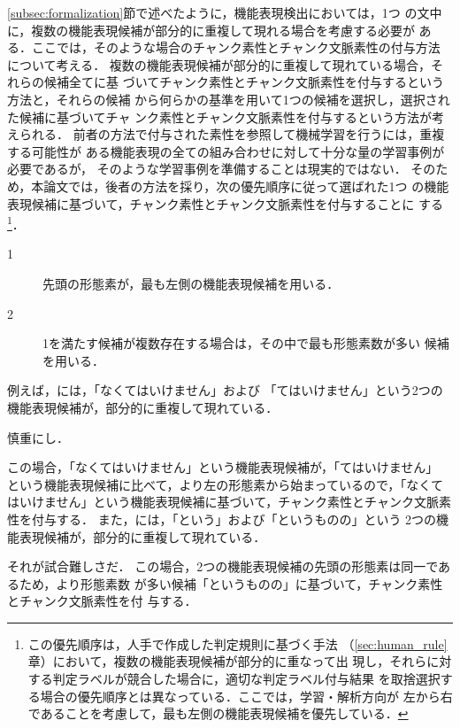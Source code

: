 \documentclass[japanese]{jnlp_1.2d}
\newcommand{\uline}[1]{}
\newcounter{example}
\newenvironment{example}{}{}
\newcommand{\strref}[1]{}
\begin{document}
\ref{subsec:formalization}節で述べたように，機能表現検出においては，1つ
の文中に，複数の機能表現候補が部分的に重複して現れる場合を考慮する必要が
ある．ここでは，そのような場合のチャンク素性とチャンク文脈素性の付与方法
について考える．
複数の機能表現候補が部分的に重複して現れている場合，それらの候補全てに基
づいてチャンク素性とチャンク文脈素性を付与するという方法と，それらの候補
から何らかの基準を用いて1つの候補を選択し，選択された候補に基づいてチャ
ンク素性とチャンク文脈素性を付与するという方法が考えられる．
前者の方法で付与された素性を参照して機械学習を行うには，重複する可能性が
ある機能表現の全ての組み合わせに対して十分な量の学習事例が必要であるが，
そのような学習事例を準備することは現実的ではない．
そのため，本論文では，後者の方法を採り，次の優先順序に従って選ばれた1つ
の機能表現候補に基づいて，チャンク素性とチャンク文脈素性を付与することに
する\footnote{この優先順序は，人手で作成した判定規則に基づく手法
（\ref{sec:human_rule}章）において，複数の機能表現候補が部分的に重なって出
現し，それらに対する判定ラベルが競合した場合に，適切な判定ラベル付与結果
を取捨選択する場合の優先順序とは異なっている．ここでは，学習・解析方向が
左から右であることを考慮して，最も左側の機能表現候補を優先している．}．
\begin{description}
 \item[1] 先頭の形態素が，最も左側の機能表現候補を用いる．
 \item[2] 1を満たす候補が複数存在する場合は，その中で最も形態素数が多い
	    候補を用いる．
\end{description}
例えば，\strref{ex:nakutehaikemasen}には，「なくてはいけません」および
「てはいけません」という2つの機能表現候補が，部分的に重複して現れている．
\begin{example}
  \item 慎重にし{\kern0pt}\uline{なく}\uline{\uline{てはいけません}}．
	\label{ex:nakutehaikemasen}
	
	
	
	
\end{example}
この場合，「なくてはいけません」という機能表現候補が，「てはいけません」
という機能表現候補に比べて，より左の形態素から始まっているので，「なくて
はいけません」という機能表現候補に基づいて，チャンク素性とチャンク文脈素
性を付与する．
また，\strref{ex:toiumonono}には，「という」および「というものの」という
2つの機能表現候補が，部分的に重複して現れている．
\begin{example}
  \item それが試合{\kern0pt}\uline{\uline{という}}\uline{ものの}{\kern0pt}難しさだ．
	\label{ex:toiumonono}
\end{example}
この場合，2つの機能表現候補の先頭の形態素は同一であるため，より形態素数
が多い候補「というものの」に基づいて，チャンク素性とチャンク文脈素性を付
与する．
\end{document}

